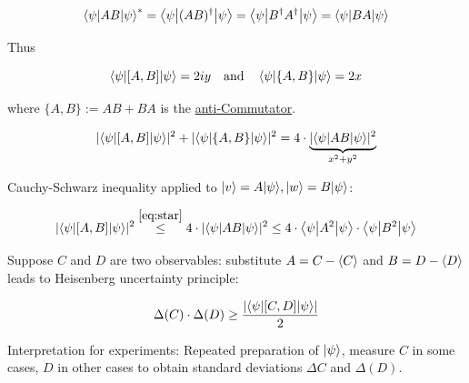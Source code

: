 \begin{equation}
     \left \langle \psi \middle| AB \middle| \psi \right \rangle^* 
        = \left \langle \psi \middle| (AB)^\dag \middle| \psi \right \rangle 
        = \left \langle \psi \middle| B^\dag A^\dag \middle| \psi \right \rangle
        = \left \langle \psi \middle| BA \middle| \psi \right \rangle
\end{equation}

Thus

\begin{equation}
    \left \langle \psi \middle| [A, B] \middle| \psi \right \rangle = 2iy \quad \text{and} \quad  \left \langle \psi \middle| \{A, B \} \middle| \psi \right \rangle = 2x
\end{equation}

where $\{A, B \} := AB + BA$ is the \underline{anti-Commutator}.

\begin{equation}\label{eq:star}
    \lvert\left \langle \psi \middle| [A, B] \middle| \psi \right \rangle\rvert^2 +  \lvert\left \langle \psi \middle| \{A, B\} \middle| \psi \right \rangle\rvert^2
        = 4  \cdot \underbrace{\lvert\left \langle \psi \middle| AB \middle| \psi \right \rangle\rvert^2}_{x^2 + y^2}
\end{equation}

Cauchy-Schwarz inequality applied to $\lvert v\rangle = A \lvert\psi\rangle, \lvert w\rangle = B \lvert\psi\rangle$:

\begin{equation}
    \lvert\left \langle \psi \middle| [A, B] \middle| \psi \right \rangle\rvert^2 
        \stackrel{\eqref{eq:star}}{\leq} 4 \cdot \lvert\left \langle \psi \middle| AB \middle| \psi \right \rangle\rvert^2 
        \leq  4 \cdot \left \langle \psi \middle| A^2 \middle| \psi \right \rangle \cdot \left \langle \psi \middle| B^2 \middle| \psi \right \rangle
\end{equation}

Suppose $C$ and $D$ are two observables: substitute $A = C - \langle C \rangle$ and 
$B = D - \langle D \rangle$ leads to Heisenberg uncertainty principle:

\begin{equation}
    \Delta(C) \cdot \Delta(D) \geq \frac{\lvert\left \langle \psi \middle| [C, D] \middle| \psi \right \rangle\rvert}{2}
\end{equation}

Interpretation for experiments: Repeated preparation of $\lvert\psi\rangle$, measure $C$ in some cases, $D$ in other
cases to obtain standard deviations $\Delta{C}$ and $\Delta(D)$. 
